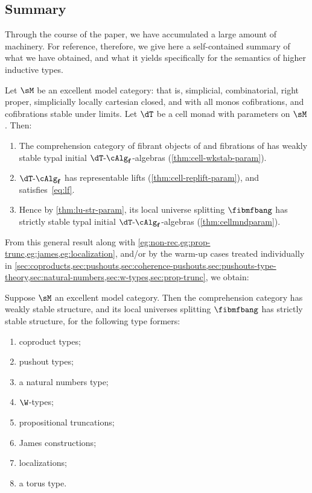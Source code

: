 \begin{enumerate}
\begin{enumerate}
\section{Summary}
\label{sec:summary}

Through the course of the paper, we have accumulated a large amount of machinery.
%
For reference, therefore, we give here a self-contained summary of what we have obtained, and what it yields specifically for the semantics of higher inductive types.

\begin{thm}
  Let $\sM$ be an excellent model category: that is, simplicial, combinatorial, right proper, simplicially locally cartesian closed, and with all monos cofibrations, and cofibrations stable under limits.
  Let $\dT$ be a cell monad with parameters on $\sM$.
  Then:
  \begin{enumerate}
  \item The comprehension category \fibmf of fibrant objects of \sM and fibrations of \sM has weakly stable typal initial $\dT\algf$-algebras (\cref{thm:cell-wkstab-param}).
  \item $\dT\algf$ has representable lifts (\cref{thm:cell-replift-param}), and \Mf satisfies~\eqref{eq:lf}.
  \item Hence by \cref{thm:lu-str-param}, its local universe splitting $\fibmfbang$ has strictly stable typal initial $\dT\algf$-algebras (\cref{thm:cellmndparam}).
  \end{enumerate}
\end{thm}

From this general result along with \cref{eg:non-rec,eg:prop-trunc,eg:james,eg:localization}, and/or by the warm-up cases treated individually in \cref{sec:coproducts,sec:pushouts,sec:coherence-pushouts,sec:pushouts-type-theory,sec:natural-numbers,sec:w-types,sec:prop-trunc}, we obtain:
% 
\begin{thm}
  Suppose $\sM$ an excellent model category.  
  Then the comprehension category \fibmf has weakly stable structure, and its local universes splitting $\fibmfbang$ has strictly stable structure, for the following type formers:
  \begin{enumerate}
  \item coproduct types;
  \item pushout types;
  \item a natural numbers type;
  \item $\W$-types;
  \item propositional truncations;
  \item James constructions;
  \item localizations;
  \item a torus type.
  \end{enumerate}
\end{thm}


\end{enumerate}
\end{enumerate}
